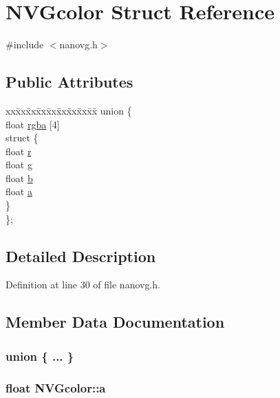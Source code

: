 \hypertarget{struct_n_v_gcolor}{\section{N\+V\+Gcolor Struct Reference}
\label{struct_n_v_gcolor}
}


{\ttfamily \#include $<$nanovg.\+h$>$}

\subsection*{Public Attributes}
\begin{DoxyCompactItemize}
\item 
\begin{tabbing}
xx\=xx\=xx\=xx\=xx\=xx\=xx\=xx\=xx\=\kill
union \{\\
\>float \hyperlink{struct_n_v_gcolor_aa1091c72571ef92c4915c1efb6fd1a36}{rgba} \mbox{[}4\mbox{]}\\
\>struct \{\\
\>\>float \hyperlink{struct_n_v_gcolor_a5fbafce12dbdd10bdd886aae9157588d}{r}\\
\>\>float \hyperlink{struct_n_v_gcolor_a03d55a20cd1abd6b1e91f9d7c6c0c29a}{g}\\
\>\>float \hyperlink{struct_n_v_gcolor_a61c93a869a5e02b2983b0fc72df4dbb4}{b}\\
\>\>float \hyperlink{struct_n_v_gcolor_a3cc22c161da763b5fa7ffa3ec7e68433}{a}\\
\>\} \\
\}; \\

\end{tabbing}\end{DoxyCompactItemize}


\subsection{Detailed Description}


Definition at line 30 of file nanovg.\+h.



\subsection{Member Data Documentation}
\hypertarget{struct_n_v_gcolor_ac3fa0855b0121f82d20118befccf6281}{\subsubsection[{"@24}]{\setlength{\rightskip}{0pt plus 5cm}union \{ ... \} }}\label{struct_n_v_gcolor_ac3fa0855b0121f82d20118befccf6281}
\hypertarget{struct_n_v_gcolor_a3cc22c161da763b5fa7ffa3ec7e68433}{
\subsubsection[{a}]{\setlength{\rightskip}{0pt plus 5cm}float N\+V\+Gcolor\+::a}}\label{struct_n_v_gcolor_a3cc22c161da763b5fa7ffa3ec7e68433}


